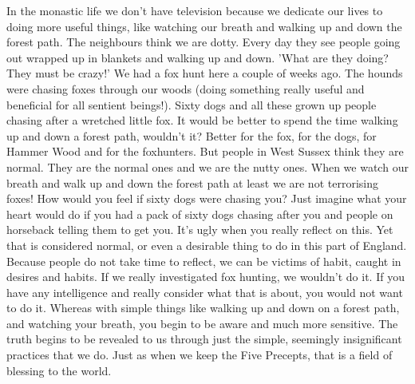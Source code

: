 In the monastic life we don't have television because we dedicate our lives to doing more useful things, like watching our breath and walking up and down the forest path. The neighbours think we are dotty. Every day they see people going out wrapped up in blankets and walking up and down. 'What are they doing? They must be crazy!' We had a fox hunt here a couple of weeks ago. The hounds were chasing foxes through our woods (doing something really useful and beneficial for all sentient beings!). Sixty dogs and all these grown up people chasing after a wretched little fox. It would be better to spend the time walking up and down a forest path, wouldn't it? Better for the fox, for the dogs, for Hammer Wood and for the foxhunters. But people in West Sussex think they are normal. They are the normal ones and we are the nutty ones. When we watch our breath and walk up and down the forest path at least we are not terrorising foxes! How would you feel if sixty dogs were chasing you? Just imagine what your heart would do if you had a pack of sixty dogs chasing after you and people on horseback telling them to get you. It's ugly when you really reflect on this. Yet that is considered normal, or even a desirable thing to do in this part of England. Because people do not take time to reflect, we can be victims of habit, caught in desires and habits. If we really investigated fox hunting, we wouldn't do it. If you have any intelligence and really consider what that is about, you would not want to do it. Whereas with simple things like walking up and down on a forest path, and watching your breath, you begin to be aware and much more sensitive. The truth begins to be revealed to us through just the simple, seemingly insignificant practices that we do. Just as when we keep the Five Precepts, that is a field of blessing to the world.


